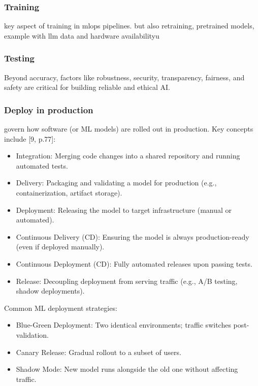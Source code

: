 \subsubsection{Training}

key aspect of training in mlops pipelines.
but also retraining, pretrained models, example with llm
data and hardware availabilityu

\subsubsection{Testing}
Beyond accuracy, factors like robustness, security, transparency, fairness, and safety are critical for building reliable and ethical AI\cite{10.1145/3555803}.

\subsubsection{Deploy in production}



\label{subsec:deployment-strategies}
govern how software (or ML models) are rolled out in production.
Key concepts include [9, p.77]:

\begin{itemize}
    \item Integration: Merging code changes into a shared repository and running automated tests.
    \item Delivery: Packaging and validating a model for production (e.g., containerization, artifact storage).
    \item Deployment: Releasing the model to target infrastructure (manual or automated).
    \item Continuous Delivery (CD): Ensuring the model is always production-ready (even if deployed manually).
    \item Continuous Deployment (CD): Fully automated releases upon passing tests.
    \item Release: Decoupling deployment from serving traffic (e.g., A/B testing, shadow deployments).
\end{itemize}
Common ML deployment strategies:
\begin{itemize}
    \item Blue-Green Deployment: Two identical environments; traffic switches post-validation.
    \item Canary Release: Gradual rollout to a subset of users.
    \item Shadow Mode: New model runs alongside the old one without affecting traffic.
\end{itemize}


